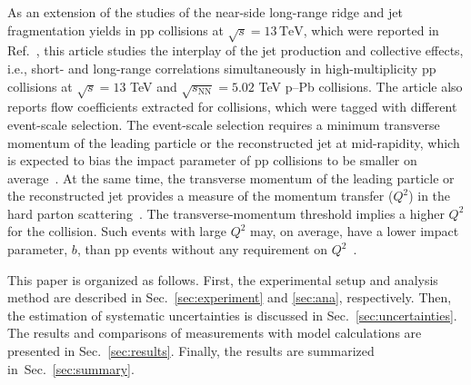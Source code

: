 As an extension of the studies of the near-side long-range ridge and jet fragmentation yields in pp collisions at $\sqrt{s}=13\,\mathrm{TeV}$, which were reported in Ref.~\cite{ALICE:2021nir}, this article studies the interplay of the jet production and collective effects, i.e., short- and long-range correlations simultaneously in high-multiplicity pp collisions at $\sqrt{s} =13$ TeV and $\sqrt{s_{\mathrm{NN}}}=5.02$ TeV p--Pb collisions. The article also reports flow coefficients extracted for collisions, which were tagged with different event-scale selection. The event-scale selection requires a minimum transverse momentum of the leading particle or the reconstructed jet at mid-rapidity, which is expected to bias the impact parameter of pp collisions to be smaller on average~\cite{Sjostrand:1986ep,Frankfurt:2003td,Frankfurt:2010ea}. At the same time, the transverse momentum of the leading particle or the reconstructed jet provides a measure of the momentum transfer ($Q^2$) in the hard parton scattering~\cite{Chatrchyan:2012tt, Chatrchyan:2011id}. The transverse-momentum threshold implies a higher $Q^2$ for the collision. Such events with large $Q^2$ may, on average, have a lower impact parameter, $b$, than pp events without any requirement on $Q^2$~\cite{Frankfurt:2003td}.

This paper is organized as follows. First, the experimental setup and analysis method are described in Sec.~\ref{sec:experiment} and \ref{sec:ana}, respectively. Then, the estimation of systematic uncertainties is discussed in Sec.~\ref{sec:uncertainties}. The results and comparisons of measurements with model calculations are presented in Sec.~\ref{sec:results}. Finally, the results are summarized in~Sec.~\ref{sec:summary}.

 
